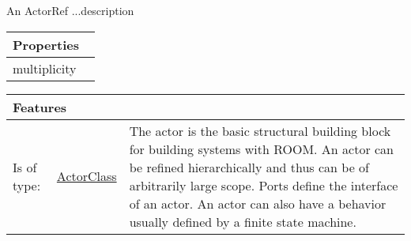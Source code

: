 			An ActorRef ...description
			
			\vspace{\baselineskip}
			\begingroup
			\renewcommand{\arraystretch}{1.8} %
			\parbox{\textwidth}{
			\begin{longtable}{l p{}}
				\multicolumn{2}{l}{\textbf{\large Properties}} \\
				\hline
			\tabitem multiplicity & \\
			\end{longtable}	
			}
			\endgroup
			\vspace{\baselineskip}
			
			\vspace{\baselineskip}
			\begingroup
			\renewcommand{\arraystretch}{1.8} %
			\parbox{\textwidth}{
			\begin{longtable}{l l p{}}
				\multicolumn{2}{l}{\textbf{\large Features}} & \\
				\hline
			Is of type: & \tabitem \hyperlink{ref:ActorClass}{ActorClass}  & The actor is the basic structural building block for building systems with ROOM. An actor can be refined hierarchically and thus can be of arbitrarily large scope. Ports define the interface of an actor. An actor can also have a behavior usually defined by a finite state machine. \\
			\hline
			\end{longtable}	
			}
			\endgroup
			\vspace{\baselineskip}
			
